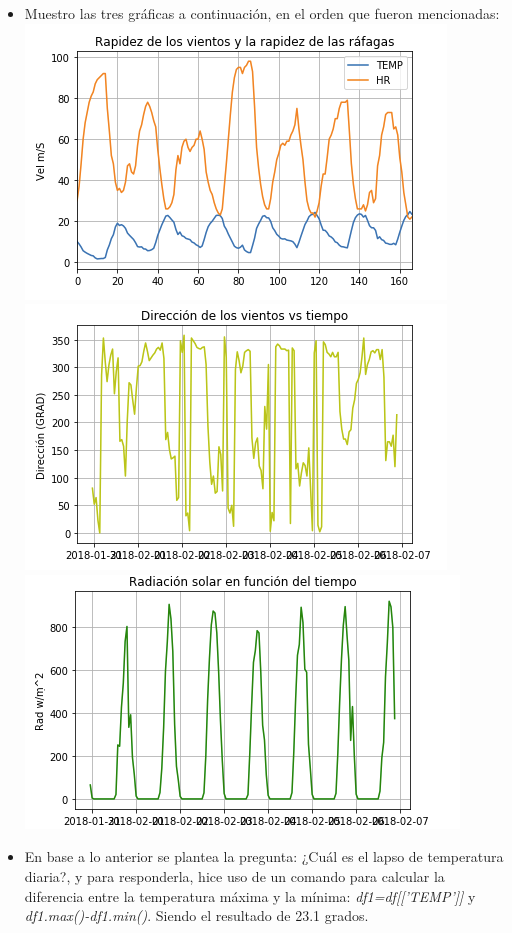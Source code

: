 \documentclass{article}
\begin{document}
\begin{doublespace}
\begin{itemize}
\item Muestro las tres gráficas a continuación, en el orden que fueron mencionadas:
\\
\includegraphics[scale=0.5]{grafica4.png}
\\
\includegraphics[scale=0.5]{grafica5.png}
\\
\includegraphics[scale=0.5]{grafica6.png}
\\
\item En base a lo anterior se plantea la pregunta: ¿Cuál es el lapso de temperatura diaria?, y para responderla, hice uso de un comando para calcular la diferencia entre la temperatura máxima y la mínima: \textit{df1=df[['TEMP']]} y
\textit{df1.max()-df1.min()}. Siendo el resultado de 23.1 grados.


\end{itemize}
\end{doublespace}
\end{document}
